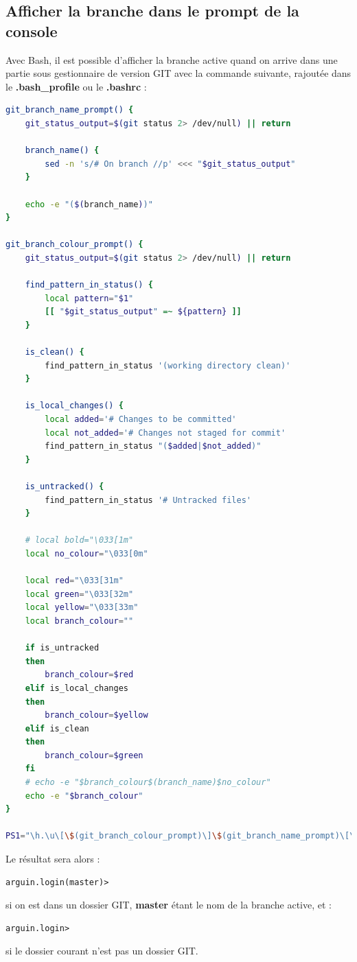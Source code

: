 \documentclass[a4paper,twoside]{article}
\begin{document}
\subsection{Afficher la branche dans le prompt de la console}
Avec Bash, il est possible d'afficher la branche active quand on arrive dans une partie sous gestionnaire de version GIT avec la commande suivante, rajoutée dans le \textbf{.bash\_profile} ou le \textbf{.bashrc} : 
\begin{lstlisting}[language=bash]
git_branch_name_prompt() {
    git_status_output=$(git status 2> /dev/null) || return

    branch_name() {
        sed -n 's/# On branch //p' <<< "$git_status_output"
    }

    echo -e "($(branch_name))"
}

git_branch_colour_prompt() {
    git_status_output=$(git status 2> /dev/null) || return

    find_pattern_in_status() {
        local pattern="$1"
        [[ "$git_status_output" =~ ${pattern} ]]
    }

    is_clean() {
        find_pattern_in_status '(working directory clean)'
    }

    is_local_changes() {
        local added='# Changes to be committed'
        local not_added='# Changes not staged for commit'
        find_pattern_in_status "($added|$not_added)"
    }

    is_untracked() {
        find_pattern_in_status '# Untracked files'
    }

    # local bold="\033[1m"
    local no_colour="\033[0m"

    local red="\033[31m"
    local green="\033[32m"
    local yellow="\033[33m"
    local branch_colour=""

    if is_untracked
    then
        branch_colour=$red
    elif is_local_changes
    then
        branch_colour=$yellow
    elif is_clean
    then
        branch_colour=$green
    fi
    # echo -e "$branch_colour$(branch_name)$no_colour"
    echo -e "$branch_colour"
}

PS1="\h.\u\[\$(git_branch_colour_prompt)\]\$(git_branch_name_prompt)\[\033[0m\]> "
\end{lstlisting}

Le résultat sera alors :
\begin{verbatim}
arguin.login(master)> 
\end{verbatim}
si on est dans un dossier GIT, \textbf{master} étant le nom de la branche active, et :
\begin{verbatim}
arguin.login> 
\end{verbatim}
si le dossier courant n'est pas un dossier GIT.
\end{document}
